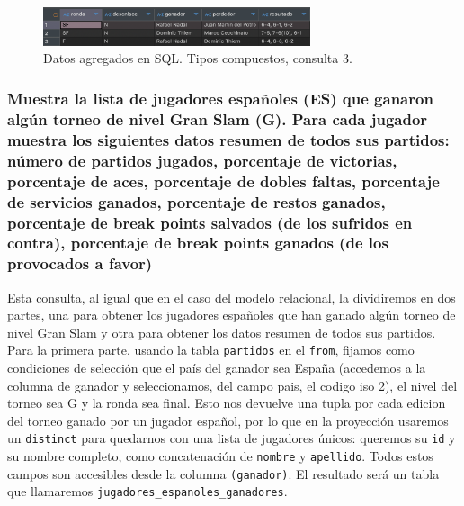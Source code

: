 \begin{figure}[H]
\centering
\includegraphics[width=0.7\textwidth]{fotos/q3_com.png}
\caption{Datos agregados en SQL. Tipos compuestos, consulta 3.}
\label{fig:q3_com}
\end{figure}




\subsubsection{Muestra la lista de jugadores españoles (ES) que ganaron algún torneo de nivel Gran Slam (G). Para cada jugador muestra los siguientes datos resumen de todos sus partidos: número de partidos jugados, porcentaje de victorias, porcentaje de aces, porcentaje de dobles faltas, porcentaje de servicios ganados, porcentaje de restos ganados, porcentaje de break points salvados (de los sufridos en contra), porcentaje de break points ganados (de los provocados a favor)}

Esta consulta, al igual que en el caso del modelo relacional, la dividiremos en dos partes, una para obtener los jugadores españoles que han ganado algún torneo de nivel Gran Slam y otra para obtener los datos resumen de todos sus partidos. Para la primera parte, usando la tabla \texttt{partidos} en el \texttt{from}, fijamos como condiciones de selección que el país del ganador sea España (accedemos a la columna de ganador y seleccionamos, del campo pais, el codigo iso 2), el nivel del torneo sea G y la ronda sea final. Esto nos devuelve una tupla por cada edicion del torneo ganado por un jugador español, por lo que en la proyección usaremos un \texttt{distinct} para quedarnos con una lista de jugadores únicos: queremos su \texttt{id} y su nombre completo, como concatenación de \texttt{nombre} y \texttt{apellido}. Todos estos campos son accesibles desde la columna \texttt{(ganador)}. El resultado será un tabla que llamaremos \texttt{jugadores\_espanoles\_ganadores}. \\

